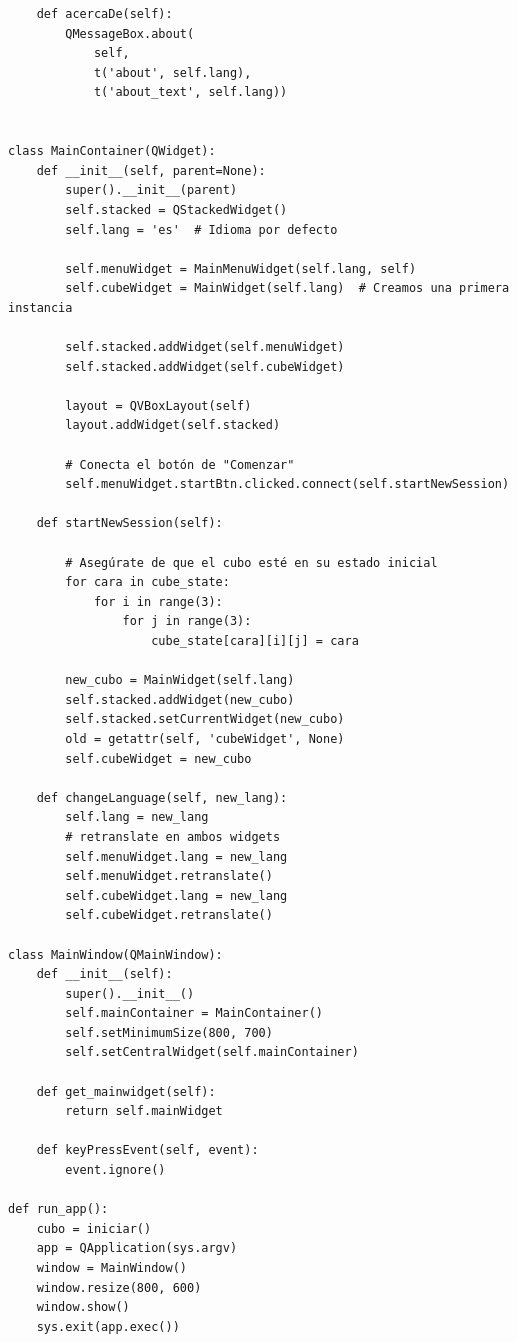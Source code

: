 \begin{lstlisting}
    def acercaDe(self):
        QMessageBox.about(
            self,
            t('about', self.lang),
            t('about_text', self.lang))


class MainContainer(QWidget):
    def __init__(self, parent=None):
        super().__init__(parent)
        self.stacked = QStackedWidget()
        self.lang = 'es'  # Idioma por defecto

        self.menuWidget = MainMenuWidget(self.lang, self)
        self.cubeWidget = MainWidget(self.lang)  # Creamos una primera instancia
        
        self.stacked.addWidget(self.menuWidget)
        self.stacked.addWidget(self.cubeWidget)

        layout = QVBoxLayout(self)
        layout.addWidget(self.stacked)

        # Conecta el botón de "Comenzar"
        self.menuWidget.startBtn.clicked.connect(self.startNewSession)

    def startNewSession(self):
        
        # Asegúrate de que el cubo esté en su estado inicial
        for cara in cube_state:
            for i in range(3):
                for j in range(3):
                    cube_state[cara][i][j] = cara
        
        new_cubo = MainWidget(self.lang)  
        self.stacked.addWidget(new_cubo)  
        self.stacked.setCurrentWidget(new_cubo)
        old = getattr(self, 'cubeWidget', None)
        self.cubeWidget = new_cubo  
    
    def changeLanguage(self, new_lang):
        self.lang = new_lang
        # retranslate en ambos widgets
        self.menuWidget.lang = new_lang
        self.menuWidget.retranslate()
        self.cubeWidget.lang = new_lang
        self.cubeWidget.retranslate()

class MainWindow(QMainWindow):
    def __init__(self):
        super().__init__()
        self.mainContainer = MainContainer()
        self.setMinimumSize(800, 700)
        self.setCentralWidget(self.mainContainer)
    
    def get_mainwidget(self):
        return self.mainWidget
    
    def keyPressEvent(self, event):
        event.ignore()
        
def run_app():
    cubo = iniciar()
    app = QApplication(sys.argv)
    window = MainWindow()
    window.resize(800, 600)
    window.show()
    sys.exit(app.exec())



\end{lstlisting}